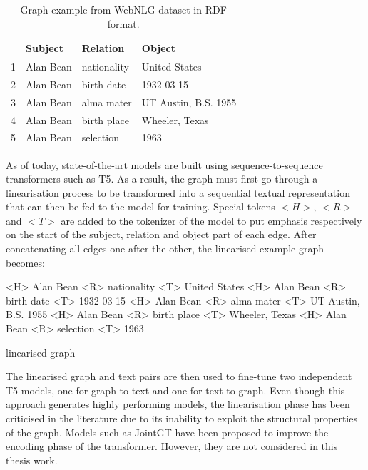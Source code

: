 \begin{table}[ht]
\centering
\caption{Graph example from WebNLG dataset in RDF format.}
\label{table:example:graph}
\begin{tabular}[t]{llll} %
\hline
 &  Subject & Relation & Object \\
\hline
1& Alan Bean & nationality & United States \\
2& Alan Bean & birth date   & 1932-03-15    \\
3& Alan Bean & alma mater   & UT Austin, B.S. 1955 \\
4& Alan Bean & birth place  & Wheeler, Texas \\
5& Alan Bean & selection   & 1963 \\
\hline
\end{tabular}
\end{table}%




As of today, state-of-the-art models are built using sequence-to-sequence transformers such as T5. As a result, the graph must first go through a linearisation process to be transformed into a sequential textual representation that can then be fed to the model for training. Special tokens $<H>$, $<R>$ and $<T>$ are added to the tokenizer of the model to put emphasis respectively on the start of the subject, relation and object part of each edge. After concatenating all edges one after the other, the linearised example graph becomes:

\epigraph{
<H> Alan Bean <R> nationality <T> United States
<H> Alan Bean <R> birth date <T> 1932-03-15
<H> Alan Bean <R> alma mater <T> UT Austin, B.S. 1955 
<H> Alan Bean <R> birth place <T> Wheeler, Texas
<H> Alan Bean <R> selection <T> 1963
}{linearised graph}

The linearised graph and text pairs are then used to fine-tune two independent T5 models, one for graph-to-text and one for text-to-graph. Even though this approach generates highly performing models, the linearisation phase has been criticised in the literature due to its inability to exploit the structural properties of the graph. Models such as JointGT\cite{JointGT} have been proposed to improve the encoding phase of the transformer. However, they are not considered in this thesis work. 




